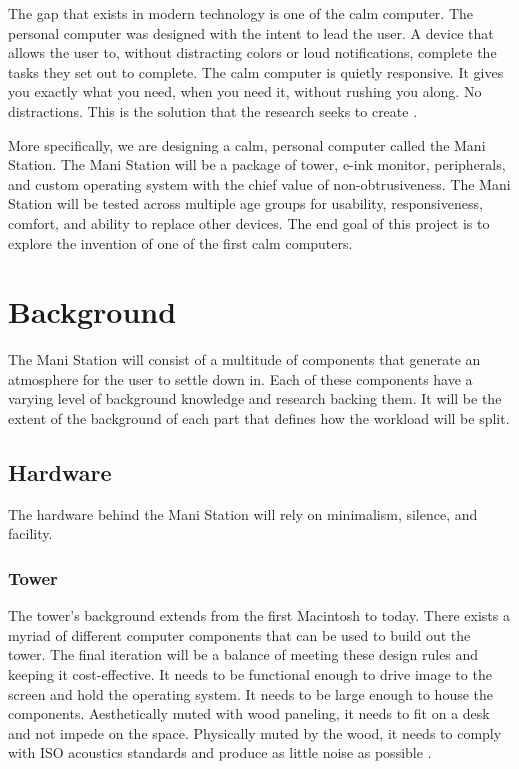 \documentclass[letterpaper,twocolumn,10pt]{article}
\begin{document}
The gap that exists in modern technology is one of the calm computer. The personal computer was designed with the intent to lead the user.  A device that allows the user to, without distracting colors or loud notifications, complete the tasks they set out to complete. The calm computer is quietly responsive. It gives you exactly what you need, when you need it, without rushing you along. No distractions. This is the solution that the research seeks to create \cite{calmcomputing}.

More specifically, we are designing a calm, personal computer called the Mani Station. The Mani Station will be a package of tower, e-ink monitor, peripherals, and custom operating system with the chief value of non-obtrusiveness. The Mani Station will be tested across multiple age groups for usability, responsiveness, comfort, and ability to replace other devices. The end goal of this project is to explore the invention of one of the first calm computers. 

\section{Background}
The Mani Station will consist of a multitude of components that generate an atmosphere for the user to settle down in. Each of these components have a varying level of background knowledge and research backing them. It will be the extent of the background of each part that defines how the workload will be split.
\subsection{Hardware}
The hardware behind the Mani Station will rely on minimalism, silence, and facility.
\subsubsection{Tower}
The tower's background extends from the first Macintosh to today. There exists a myriad of different computer components that can be used to build out the tower. The final iteration will be a balance of meeting these design rules and keeping it cost-effective. It needs to be functional enough to drive image to the screen and hold the operating system. It needs to be large enough to house the components. Aesthetically muted with wood paneling, it needs to fit on a desk and not impede on the space. Physically muted by the wood, it needs to comply with ISO acoustics standards and produce as little noise as possible \cite{ISO9296}.
\end{document}
